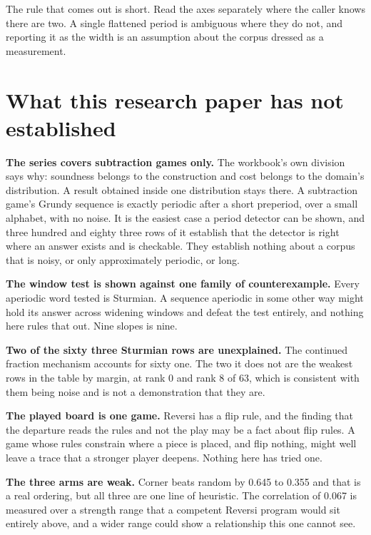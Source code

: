 The rule that comes out is short. Read the axes separately where the caller knows there are two. A
single flattened period is ambiguous where they do not, and reporting it as the width is an
assumption about the corpus dressed as a measurement.

\section{What this research paper has not established}

\textbf{The series covers subtraction games only.} The workbook's own division~\cite{src:Quigg-orior-workbook} says why: soundness
belongs to the construction and cost belongs to the domain's distribution. A result obtained inside
one distribution stays there. A subtraction game's Grundy sequence is exactly periodic after a short
preperiod, over a small alphabet, with no noise. It is the easiest case a period detector can be
shown, and three hundred and eighty three rows of it establish that the
detector is right where an answer exists and is checkable. They establish nothing about a corpus
that is noisy, or only approximately periodic, or long.

\textbf{The window test is shown against one family of counterexample.} Every aperiodic word tested
is Sturmian. A sequence aperiodic in some other way might hold its answer across widening windows and
defeat the test entirely, and nothing here rules that out. Nine slopes is nine.

\textbf{Two of the sixty three Sturmian rows are unexplained.} The continued fraction mechanism
accounts for sixty one. The two it does not are the weakest rows in the table by margin, at rank 0
and rank 8 of 63, which is consistent with them being noise and is not a demonstration that they are.

\textbf{The played board is one game.} Reversi has a flip rule, and the finding that the departure
reads the rules and not the play may be a fact about flip rules. A game whose rules constrain where
a piece is placed, and flip nothing, might well leave a trace that a stronger player deepens. Nothing
here has tried one.

\textbf{The three arms are weak.} Corner beats random by 0.645 to 0.355 and that is a real ordering,
but all three are one line of heuristic. The correlation of 0.067 is measured over a strength range
that a competent Reversi program would sit entirely above, and a wider range could show a
relationship this one cannot see.

